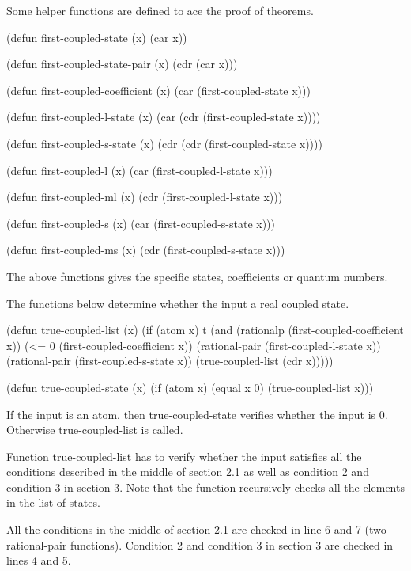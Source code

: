 \documentclass[12pt,journal,compsoc]{IEEEtran}
\begin{document}
Some helper functions are defined to ace the proof of theorems.

\begin{acl2-lst}
(defun first-coupled-state (x)
 (car x))

(defun first-coupled-state-pair (x)
 (cdr (car x)))

(defun first-coupled-coefficient (x)
 (car (first-coupled-state x)))

(defun first-coupled-l-state (x)
 (car (cdr 
        (first-coupled-state x))))

(defun first-coupled-s-state (x)
 (cdr (cdr 
	(first-coupled-state x))))

(defun first-coupled-l (x)
 (car (first-coupled-l-state x)))

(defun first-coupled-ml (x)
 (cdr (first-coupled-l-state x)))

(defun first-coupled-s (x)
 (car (first-coupled-s-state x)))

(defun first-coupled-ms (x)
 (cdr (first-coupled-s-state x)))
\end{acl2-lst}

The above functions gives the specific states, coefficients or quantum numbers.

The functions below determine whether the input a real coupled state.

\begin{acl2-lst}
(defun true-coupled-list (x)
 (if (atom x)
  t
  (and (rationalp (first-coupled-coefficient x))
   (<= 0 (first-coupled-coefficient x))
   (rational-pair (first-coupled-l-state x))
   (rational-pair (first-coupled-s-state x))
   (true-coupled-list (cdr x)))))

(defun true-coupled-state (x)
 (if (atom x)
  (equal x 0)
  (true-coupled-list x)))
\end{acl2-lst}

If the input is an atom, then true-coupled-state verifies whether the input is 0. Otherwise true-coupled-list is called.

Function true-coupled-list has to verify whether the input satisfies all the conditions described in the middle of section 2.1 as well as condition 2 and condition 3 in section 3. Note that the function recursively checks all the elements in the list of states. 

All the conditions in the middle of section 2.1 are checked in line 6 and 7 (two rational-pair functions). Condition 2 and condition 3 in section 3 are checked in lines 4 and 5. 
\end{document}
